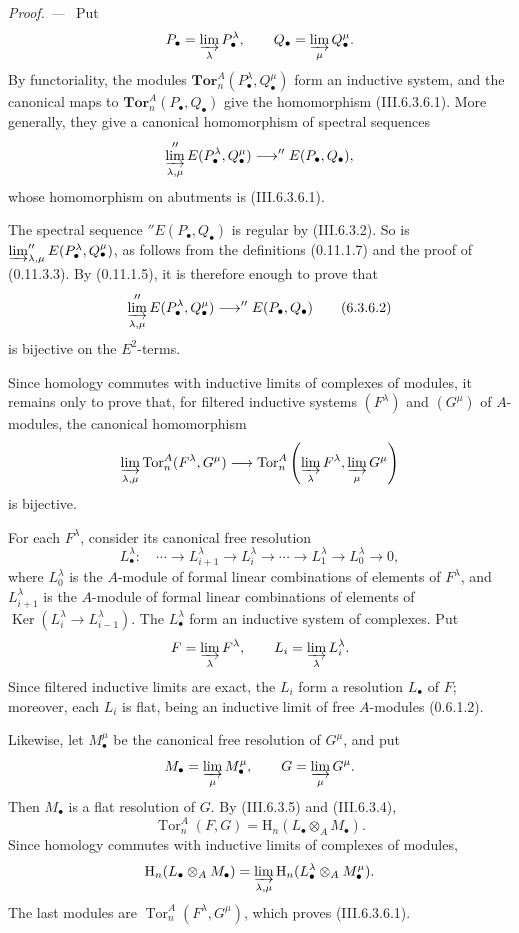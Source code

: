 \documentclass[10pt,oneside]{book}
\newcommand{\HH}{\mathrm H}
\newcommand{\Tor}{\operatorname{Tor}}
\newcommand{\Ker}{\operatorname{Ker}}
\newcommand{\sref}[2][]{(#2)}
\newcommand{\oldpage}[2][]{\setcounter{footnote}{0}\marginpar{\scriptsize\textbf{#1}~|~#2}\ignorespaces}
\newenvironment{proof}{\par\medskip\noindent\textit{Proof. ---\ }}{\par}
\begin{document}
\begin{proof}
Put
\[
  P_\bullet=\varinjlim_\lambda P_\bullet^\lambda,
  \qquad
  Q_\bullet=\varinjlim_\mu Q_\bullet^\mu.
\]
By functoriality, the modules
$\mathbf{Tor}_n^A(P_\bullet^\lambda,Q_\bullet^\mu)$ form an
inductive system, and
\oldpage[III]{143}
the canonical maps to
$\mathbf{Tor}_n^A(P_\bullet,Q_\bullet)$ give the homomorphism
\sref{III.6.3.6.1}.  More generally, they give a canonical
homomorphism of spectral sequences
\[
  \varinjlim_{\lambda,\mu}
  ''E(P_\bullet^\lambda,Q_\bullet^\mu)
  \longrightarrow
  ''E(P_\bullet,Q_\bullet),
\]
whose homomorphism on abutments is \sref{III.6.3.6.1}.

The spectral sequence $''E(P_\bullet,Q_\bullet)$ is regular by
\sref{III.6.3.2}.  So is
$\varinjlim_{\lambda,\mu}''E(P_\bullet^\lambda,Q_\bullet^\mu)$,
as follows from the definitions \sref[0]{0.11.1.7} and the proof
of \sref[0]{0.11.3.3}.  By \sref[0]{0.11.1.5}, it is therefore
enough to prove that
\[
  \varinjlim_{\lambda,\mu}
  ''E(P_\bullet^\lambda,Q_\bullet^\mu)
  \longrightarrow
  ''E(P_\bullet,Q_\bullet)
  \tag{6.3.6.2}\label{III.6.3.6.2}
\]
is bijective on the $E^2$-terms.

Since homology commutes with inductive limits of complexes of
modules, it remains only to prove that, for filtered inductive
systems $(F^\lambda)$ and $(G^\mu)$ of $A$-modules, the canonical
homomorphism
\[
  \varinjlim_{\lambda,\mu}\Tor_n^A(F^\lambda,G^\mu)
  \longrightarrow
  \Tor_n^A\left(
    \varinjlim_\lambda F^\lambda,
    \varinjlim_\mu G^\mu
  \right)
\]
is bijective.

For each $F^\lambda$, consider its canonical free resolution
\[
  L_\bullet^\lambda:\quad
  \cdots\longrightarrow L_{i+1}^\lambda
  \longrightarrow L_i^\lambda
  \longrightarrow\cdots\longrightarrow
  L_1^\lambda\longrightarrow L_0^\lambda\longrightarrow0,
\]
where $L_0^\lambda$ is the $A$-module of formal linear
combinations of elements of $F^\lambda$, and
$L_{i+1}^\lambda$ is the $A$-module of formal linear combinations
of elements of
$\Ker(L_i^\lambda\to L_{i-1}^\lambda)$.  The
$L_\bullet^\lambda$ form an inductive system of complexes.  Put
\[
  F=\varinjlim_\lambda F^\lambda,
  \qquad
  L_i=\varinjlim_\lambda L_i^\lambda.
\]
Since filtered inductive limits are exact, the $L_i$ form a
resolution $L_\bullet$ of $F$; moreover, each $L_i$ is flat, being
an inductive limit of free $A$-modules \sref[0]{0.6.1.2}.

Likewise, let $M_\bullet^\mu$ be the canonical free resolution of
$G^\mu$, and put
\[
  M_\bullet=\varinjlim_\mu M_\bullet^\mu,
  \qquad
  G=\varinjlim_\mu G^\mu.
\]
Then $M_\bullet$ is a flat resolution of $G$.  By
\sref{III.6.3.5} and \sref{III.6.3.4},
\[
  \Tor_n^A(F,G)=\HH_n(L_\bullet\otimes_AM_\bullet).
\]
Since homology commutes with inductive limits of complexes of
modules,
\[
  \HH_n(L_\bullet\otimes_AM_\bullet)
  =
  \varinjlim_{\lambda,\mu}
  \HH_n(L_\bullet^\lambda\otimes_AM_\bullet^\mu).
\]
The last modules are $\Tor_n^A(F^\lambda,G^\mu)$, which proves
\sref{III.6.3.6.1}.


\end{proof}
\end{document}
